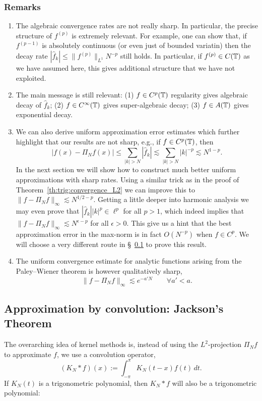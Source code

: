 \subsubsection{Remarks}
\begin{enumerate}
  \item The algebraic convergence rates are not really sharp. In particular, the
    precise structure of $f^{(p)}$ is extremely relevant. For example, one can
    show that, if $f^{(p-1)}$ is absolutely continuous (or even just of bounded variatin)
    then the decay rate $|\hat{f}_k| \leq \|f^{(p)}\|_{L^1} N^{-p}$ still holds.
    In particular, if $f^{(p)} \in C(\mathbb{T})$ as we have assumed here, this gives
    additional structure that we have not exploited.

  \item The main message is still relevant: (1) $f \in C^p(\mathbb{T})$ regularity
  gives algebraic decay of $\hat{f}_k$; (2) $f \in C^\infty(\mathbb{T})$ gives
  super-algebraic decay; (3) $f \in A(\mathbb{T})$ gives exponential decay.

  \item We can also derive uniform approximation error estimates which further
  highlight that our results are not sharp, e.g.,  if $f \in C^p(\mathbb{T})$, then
  \[
    |f(x) - \Pi_N f(x)| \leq \sum_{|k| > N} |\hat{f}_k|
        \lesssim \sum_{|k| > N} |k|^{-p}
        \lesssim N^{1-p}.
  \]
  In the next section we will show how to construct much better uniform
  approximations with sharp rates. Using a similar trick as in the proof of
  Theorem~\ref{th:trig:convergence_L2} we can improve this to $\|f-\Pi_N f
  \|_\infty \lesssim N^{1/2-p}$. Getting a little deeper into harmonic analysis
  we may even prove that $|\hat f_k| |k|^p \in \ell^p$ for all $p > 1$, which
  indeed implies that $\|f - \Pi_N f \|_\infty \lesssim N^{\epsilon - p}$ for
  all $\epsilon > 0$. This give us a hint that the best approximation error in
  the max-norm is in fact $O(N^{-p})$ when $f \in C^p$. We will choose a very
  different route in \S~\ref{sec:trig:jackson} to prove this result.

  \item The uniform convergence estimate for analytic functions arising from
  the Paley--Wiener theorem is however qualitatively sharp,
  \[
       \|f - \Pi_N f \|_\infty \lesssim e^{- a' N} \qquad \forall a' < a.
  \]
\end{enumerate}




\subsection{Approximation by convolution: Jackson's Theorem}
%
\label{sec:trig:jackson}
%
The overarching idea of kernel methods is, instead of using the
$L^2$-projection $\Pi_N f$ to approximate $f$, we use a convolution operator,
\[
    (K_N \ast f)(x) := \int_{-\pi}^\pi K_N(t-x) f(t) \, dt.
\]
If $K_N(t)$ is a trigonometric polynomial, then $K_N \ast f$ will also be a trigonometric polynomial:

